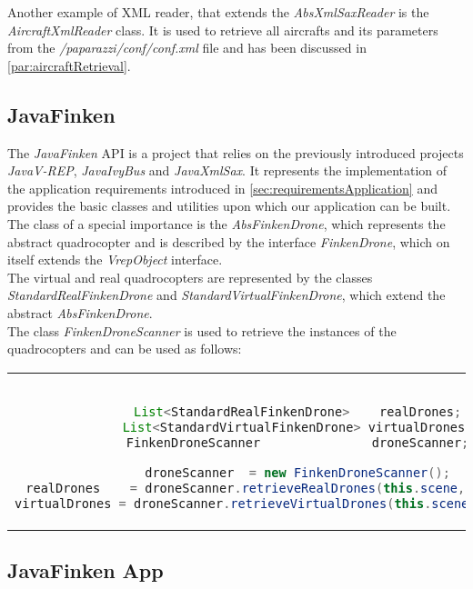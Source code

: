 Another example of XML reader, that extends the \textit{AbsXmlSaxReader} is the \textit{AircraftXmlReader} class. It is used to retrieve all aircrafts and its parameters from the 
\textit{/paparazzi/conf/conf.xml} file and has been discussed in \ref{par:aircraftRetrieval}. 


\subsection{JavaFinken}
\label{sec:javaFinkenImplementation}

The \textit{JavaFinken} API is a project that relies on the previously introduced projects \textit{JavaV-REP}, \textit{JavaIvyBus} and \textit{JavaXmlSax}. It represents the implementation of the application requirements introduced in \ref{sec:requirementsApplication} and provides the basic classes and utilities upon which our application can be built.\\

The class of a special importance is the \textit{AbsFinkenDrone}, which represents the abstract quadrocopter and is described by the interface \textit{FinkenDrone}, which on itself extends the \textit{VrepObject} interface.\\
The virtual and real quadrocopters are represented by the classes \textit{StandardRealFinkenDrone} and \textit{StandardVirtualFinkenDrone}, which extend the abstract \textit{AbsFinkenDrone}.\\
The class \textit{FinkenDroneScanner} is used to retrieve the instances of the quadrocopters and can be used as follows:

\begin{center}
\begin{tabular}{c}
\begin{lstlisting}[basicstyle=\small, language=Java, caption={Detect virtual FINken in simulation scene}]

List<StandardRealFinkenDrone>    realDrones;
List<StandardVirtualFinkenDrone> virtualDrones;
FinkenDroneScanner               droneScanner;

droneScanner  = new FinkenDroneScanner();
realDrones    = droneScanner.retrieveRealDrones(this.scene, this.client);
virtualDrones = droneScanner.retrieveVirtualDrones(this.scene, this.client);

\end{lstlisting}
\end{tabular}
\end{center}

\subsection{JavaFinken App}
\label{sec:javaFinkenApp}

